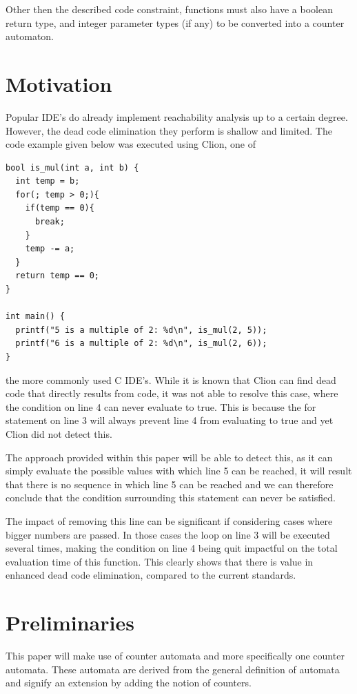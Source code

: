 \documentclass[12pt]{article}
\begin{document}
Other then the described code constraint, functions must also have a boolean return type, and integer parameter types (if any) to be converted into a counter automaton.

\section{Motivation}
Popular IDE's do already implement reachability analysis up to a certain degree. However, the dead code elimination they perform is shallow and limited. The code example given below was executed using Clion, one of 

\begin{lstlisting}[style=CStyle]
bool is_mul(int a, int b) {
  int temp = b;
  for(; temp > 0;){
    if(temp == 0){
      break;
    }
    temp -= a;
  }
  return temp == 0;
}

int main() {
  printf("5 is a multiple of 2: %d\n", is_mul(2, 5));
  printf("6 is a multiple of 2: %d\n", is_mul(2, 6));
}
\end{lstlisting}

\noindent
the more commonly used C IDE's. While it is known that Clion can find dead code that directly results from code, it was not able to resolve this case, where the condition on line 4 can never evaluate to true. This is because the for statement on line 3 will always prevent line 4 from evaluating to true and yet Clion did not detect this. 

The approach provided within this paper will be able to detect this, as it can simply evaluate the possible values with which line 5 can be reached, it will result that there is no sequence in which line 5 can be reached and we can therefore conclude that the condition surrounding this statement can never be satisfied.

The impact of removing this line can be significant if considering cases where bigger numbers are passed. In those cases the loop on line 3 will be executed several times, making the condition on line 4 being quit impactful on the total evaluation time of this function. This clearly shows that there is value in enhanced dead code elimination, compared to the current standards. 

\section{Preliminaries}
This paper will make use of counter automata and more specifically one counter automata. These automata are derived from the general definition of automata and signify an extension by adding the notion of counters.
\end{document}
